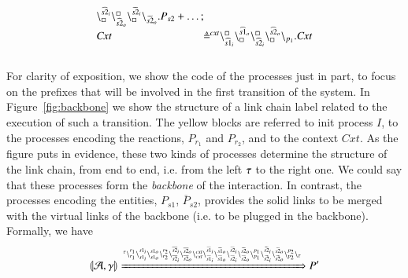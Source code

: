 \begin{example}
\[\begin{array}{l@{\hspace{-0.009cm}}c@{\hspace{-0.009cm}}ll@{\hspace{-0.009cm}}c@{\hspace{-0.009cm}}l}
   \chainedlink{\noact} {\widehat{s2}_i}\chainedlink{\widehat{s2}_o}{\noact}\chainedlink{\noact} {\widetilde{s2}_i}\chainend{\widetilde{s2}_o}.P_{s2} + \dots;\\
 \mathit{Cxt}& \defeq & \startchain{\mathit{cxt}}\chainedlink{\widehat{s1}_i}{\noact}\chainedlink{\noact}{\widehat{s1}_o}
  \chainedlink{\widehat{s2}_i}{\noact}\chainedlink{\noact}{\widehat{s2}_o}\chainend{p_1}.\mathit{Cxt}
\end{array}
\]  \\
For clarity of exposition, we show the code of the processes just in part, to focus on the prefixes that will be involved in the first transition of the system. In Figure~\ref{fig:backbone} we show the  structure of a link chain label related to the execution of such a transition. The yellow blocks are referred to init process $I$, to the processes encoding the reactions, $P_{r_1}$ and $P_{r_2}$, and to the context $\mathit{Cxt}$. As the figure puts in evidence, these two kinds of processes determine the structure of the link chain, from end to end, i.e. from the left $\tau$ to the right one. We could say that these processes form the \emph{backbone} of the interaction.
   In contrast, the processes encoding the entities, $P_{s1}$,  $\overline{P}_{s2}$, provides the
    solid links to be merged with the virtual links of the backbone (i.e. to be plugged in the backbone).
 Formally, we have
 $$
 \llparenthesis{\cal A},\gamma\rrparenthesis \xRightarrow{
 \ensuremath{{}^{\tau}}
 \ensuremath{\backslash_{r_1}^{r_1}}
 \ensuremath{\backslash_{s1_i}^{s1_i}}
 \ensuremath{\backslash_{s1_o}^{s1_o}}
 \ensuremath{\backslash_{r_2}^{r_2}}
 \ensuremath{\backslash_{\overline{s2}_i}^{\overline{s2}_i}}
 \ensuremath{\backslash_{\overline{s2}_o}^{\overline{s2}_o}}
 \ensuremath{\backslash_{\mathit{cxt}}^{\mathit{cxt}}}
 \ensuremath{\backslash_{\widehat{s1}_i}^{\widehat{s1}_i}}
 \ensuremath{\backslash_{\widehat{s1}_o}^{\widehat{s1}_o}}
  \ensuremath{\backslash_{\widehat{s2}_i}^{\widehat{s2}_i}}
  \ensuremath{\backslash_{\widehat{s2}_o}^{\widehat{s2}_o}}
  \ensuremath{\backslash_{p_1}^{p_1}}
  \ensuremath{\backslash_{\widetilde{s2}_i}^{\widetilde{s2}_i}}
  \ensuremath{\backslash_{\widetilde{s2}_o}^{\widetilde{s2}_o}}
  \ensuremath{\backslash_{p_2}^{p_2}}
  \ensuremath{\backslash_{\tau}}
 }
 P'
 $$
 

\end{example}
